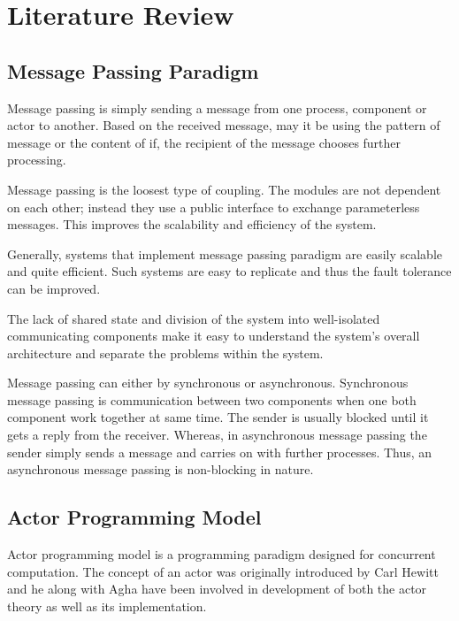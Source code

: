 \chapter{Literature Review}\label{chapter:literature_review}

\section{Message Passing Paradigm}
\label{sec:messagePassing}
  Message passing is simply sending a message from one process, component or actor to another. Based on the received message, may it be using the pattern of message or the content of if, the recipient of the message chooses further processing.

  Message passing is the loosest type of coupling. The modules are not dependent on each other; instead they use a public interface to exchange parameterless messages\cite{joecelko}. This improves the scalability and efficiency of the system.

  Generally, systems that implement message passing paradigm are easily scalable and quite efficient. Such systems are easy to replicate and thus the fault tolerance can be improved. \cite{Armstrong:2010:ERL:1810891.1810910}

  The lack of shared state and division of the system into well-isolated communicating components make it easy to understand the system’s overall architecture and separate the problems within the system. \cite{Armstrong:2010:ERL:1810891.1810910}

  Message passing can either by synchronous or asynchronous. Synchronous message passing is communication between two components when one both component work together at same time. The sender is usually blocked until it gets a reply from the receiver. Whereas, in asynchronous message passing the sender simply sends a message and carries on with further processes. Thus, an asynchronous message passing is non-blocking in nature.

\section{Actor Programming Model}
\label{sec:actorProgramming}
  Actor programming model is a programming paradigm designed for concurrent computation. The concept of an actor was originally introduced by Carl Hewitt\cite{hewitt} and he along with Agha\cite{agha} have been involved in development of both the actor theory as well as its implementation.

